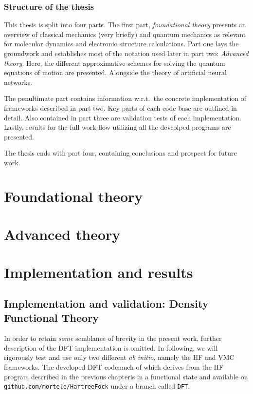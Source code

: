 \documentclass[twoside,english]{uiofysmaster}
\newcommand{\inlinecc}[1]{\lstinline[language={[std]c++}]{#1}}
\begin{document}
\section{Structure of the thesis}
This thesis is split into four parts. The first part, \emph{foundational theory} presents an overview of classical mechanics (very briefly) and quantum mechanics as relevant for molecular dynamics and electronic structure calculations. Part one lays the groundwork and establishes most of the notation used later in part two: \emph{Advanced theory}. Here, the different approximative schemes for solving the quantum equations of motion are presented. Alongside  the theory of artificial neural networks.

The penultimate part contains information w.r.t.\ the concrete implementation of frameworks described in part two. Key parts of each code base are outlined in detail. Also contained in part three are validation tests of each implementation. Lastly, results for the full work-flow utilizing all the deveolped programs are presented.

The thesis ends with part four, containing conclusions and prospect for future work.

\nocite{ISO80000}
\nocite{stende}
\nocite{treider}
\nocite{dragly}

\part{Foundational theory}




\part{Advanced theory}





\part{Implementation and results}



\chapter{Implementation and validation: Density Functional Theory\label{DFTT}}
In order to retain \emph{some} semblance of brevity in the present work, further description of the DFT implementation is omitted. In following, we will rigorously test and use only two different \emph{ab initio}, namely the HF and VMC frameworks. The developed DFT code\textemdash much of which derives from the HF program described in the previous chapter\textemdash is in a functional state and available on \inlinecc{github.com/mortele/HartreeFock} under a branch called \inlinecc{DFT}. 
\end{document}
